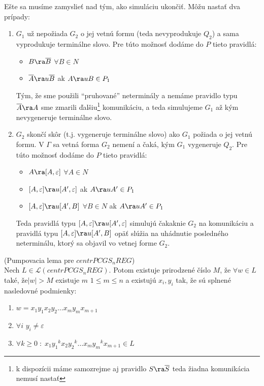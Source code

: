 \begin{dokaz}
\smallskip

Ešte sa musíme zamyslieť nad tým, ako simuláciu ukončiť. Môžu
nastať dva prípady:
\begin{enumerate}
  \item $G_1$ už nepožiada $G_2$ o jej vetnú formu (teda nevyprodukuje $Q_2$)
  a sama vyprodukuje terminálne slovo. Pre túto možnosť dodáme do
  $P$ tieto pravidlá:
  \begin{itemize}
    \item $B\ra \overline{B}$  $\forall B\in N$
    \item $\overline{A}\ra u\overline{B}$ ak $A\ra uB\in P_1$
  \end{itemize}
  Tým, že sme použili ``pruhované'' neterminály a nemáme pravidlo
  typu $\overline{A}\ra A$ sme zmarili ďalšiu\footnote{k dispozícii
  máme samozrejme aj pravidlo $S\ra\overline{S}$ teda
  žiadna komunikácia nemusí nastať} komunikáciu, a teda simulujeme
  $G_1$ až kým nevygeneruje terminálne slovo.
  \item $G_2$ skončí skôr (t.j. vygeneruje terminálne slovo) ako
  $G_1$ požiada o jej vetnú formu. V $\Gamma$ sa vetná forma $G_2$
  nemení a čaká, kým $G_1$ vygeneruje $Q_2$. Pre túto možnosť dodáme
  do $P$ tieto pravidlá:
  \begin{itemize}
    \item $A\ra [A,\varepsilon]$  $\forall A\in N$
    \item $[A,\varepsilon]\ra u[A',\varepsilon]$ ak $A\ra uA'\in P_1$
    \item $[A,\varepsilon]\ra u[A',B]$  $\forall B\in N$ ak $A\ra uA'\in P_1$
  \end{itemize}
Teda pravidlá typu $[A,\varepsilon]\ra u[A',\varepsilon]$ simulujú
čakaknie $G_2$ na komunikáciu a pravidlá typu $[A,\varepsilon]\ra
u[A',B]$ opäť slúžia na uhádnutie posledného neterminálu, ktorý sa
objavil vo vetnej forme $G_2$.
\end{enumerate}
\end{dokaz}

\begin{lema}
\label{pcgs_lema_pumplemacentrPCGSnREG} (Pumpovacia lema pre
$centrPCGS_nREG$)
\\ Nech $L\in\mathcal{L}(centrPCGS_nREG)$. Potom existuje prirodzené číslo $M$, že
$\forall w\in L$ také, že\linebreak $|w|>M$ existuje $m$ $1\leq
m\leq n$ a existujú $x_i,y_i$ tak, že sú splnené nasledovné
podmienky:
\begin{enumerate}
  \item $w=x_1y_1x_2y_2\dots x_my_mx_{m+1}$
  \item $\forall i$ $y_i\neq\varepsilon$
  \item $\forall k\geq 0\; :\; x_1{y_1}^kx_2{y_2}^k\dots x_m{y_m}^kx_{m+1}\in L$
\end{enumerate}
\end{lema}

